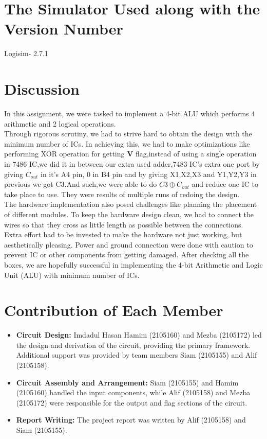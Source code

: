 \documentclass{article}
\begin{document}
\section{The Simulator Used along with the Version Number}
 Logisim- 2.7.1
\section{Discussion}

 In this assignment, we were tasked to implement a 4-bit ALU which performs 4 arithmetic
 and 2 logical operations.\\
 
 Through rigorous scrutiny, we had to strive hard to obtain the design with the minimum
 number of ICs. In achieving this, we had to make optimizations like performing XOR operation for getting \textbf{V} flag,instead of using a single operation in 7486 IC,we did it in between our extra used adder,7483 IC's extra one port by giving $C_{out}$ in it's A4 pin, 0 in B4 pin and by giving X1,X2,X3 and Y1,Y2,Y3 in previous we got C3.And such,we were able to do $C3 \oplus C_{out} $ and reduce one IC to take place to use. They were results of multiple runs of redoing the
 design.\\

 The hardware implementation also posed challenges like planning the placement of different
 modules. To keep the hardware design clean, we had to connect the wires so that they cross
 as little length as possible between the connections. Extra effort had to be invested to make
 the hardware not just working, but aesthetically pleasing. Power and ground connection
 were done with caution to prevent IC or other components from getting damaged.
 After checking all the boxes, we are hopefully successful in implementing the 4-bit Arithmetic
 and Logic Unit (ALU) with minimum number of ICs.
\section{Contribution of Each Member}

\begin{itemize}
    \item \textbf{Circuit Design:} Imdadul Hasan Hamim (2105160) and Mezba (2105172) led the design and derivation of the circuit, providing the primary framework. Additional support was provided by team members Siam (2105155) and Alif (2105158).
    
    \item \textbf{Circuit Assembly and Arrangement:} Siam (2105155) and Hamim (2105160) handled the input components, while Alif (2105158) and Mezba (2105172) were responsible for the output and flag sections of the circuit.
    
    \item \textbf{Report Writing:} The project report was written by Alif (2105158) and Siam (2105155).
\end{itemize}
\end{document}
